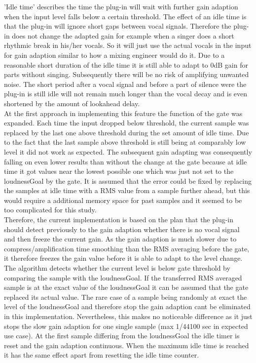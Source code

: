 'Idle time' describes the time the plug-in will wait with further gain adaption when the input level falls below a certain threshold. The effect of an idle time is that the plug-in will ignore short gaps between vocal signals. Therefore the plug-in does not change the adapted gain for example when a singer does a short rhythmic break in his/her vocals. So it will just use the actual vocals in the input for gain adaption similar to how a mixing engineer would do it. Due to a reasonable short duration of the idle time it is still able to adapt to 0dB gain for parts without singing. Subsequently there will be no risk of amplifying unwanted noise. The short period after a vocal signal and before a part of silence were the plug-in is still idle will not remain much longer than the vocal decay and is even shortened by the amount of lookahead delay.\\
At the first approach in implementing this feature the function of the gate was expanded. Each time the input dropped below threshold, the current sample was replaced by the last one above threshold during the set amount of idle time. Due to the fact that the last sample above threshold is still being at comparably low level it did not work as expected. The subsequent gain adapting was consequently falling on even lower results than without the change at the gate because at idle time it got values near the lowest possible one which was just not set to the loudnessGoal by the gate. It is assumed that the error could be fixed by replacing the samples at idle time with a RMS value from a sample further ahead, but this would require a additional memory space for past samples and it seemed to be too complicated for this study.\\
Therefore, the current implementation is based on the plan that the plug-in should detect previously to the gain adaption whether there is no vocal signal and then freeze the current gain. As the gain adaption is much slower due to compress/amplification time smoothing than the RMS averaging before the gate, it therefore freezes the gain value before it is able to adapt to the level change.\\
The algorithm detects whether the current level is below gate threshold by comparing the sample with the loudnessGoal. If the transferred RMS averaged sample is at the exact value of the loudnessGoal it can be assumed that the gate replaced its actual value. The rare case of a sample being randomly at exact the level of the loudnessGoal and therefore stop the gain adaption cant be eliminated in this implementation. Nevertheless, this makes no noticeable difference as it just stops the slow gain adaption for one single sample (max 1/44100 sec in expected use case). At the first sample differing from the loudnessGoal the idle timer is reset and the gain adaption continuous. When the maximum idle time is reached it has the same effect apart from resetting the idle time counter.\\
